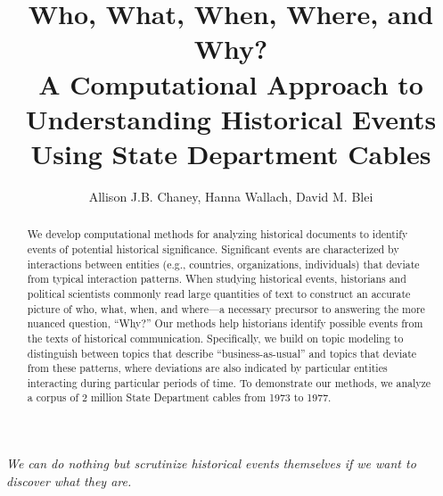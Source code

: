 



\usepackage{epigraph}



\title{Who, What, When, Where, and Why? \\ A Computational Approach to Understanding Historical Events Using State Department Cables}

\author{Allison J.B. Chaney, Hanna Wallach, David M. Blei}

\maketitle

\vspace{0.3in}

\begin{center}
\parbox{3.5in}{
\raggedright{
 	\emph{We can do nothing but scrutinize historical events themselves if we want to discover what they are.}}\\
\smallskip
{}
}
\end{center}

\vspace{0.5in}

\begin{abstract}
	We develop computational methods for analyzing historical documents to identify events of potential historical significance. Significant events are characterized by interactions between entities (e.g., countries, organizations, individuals) that deviate from typical interaction patterns. When studying historical events, historians and political scientists commonly read large quantities of text to construct an accurate picture of who, what, when, and where---a necessary precursor to answering the more nuanced question, ``Why?'' Our methods help historians identify possible events from the texts of historical communication. Specifically, we build on topic modeling to distinguish between topics that describe ``business-as-usual'' and topics that deviate from these patterns, where deviations are also indicated by particular entities interacting during particular periods of time. To demonstrate our methods, we analyze a corpus of 2 million State Department cables from 1973 to 1977. %
\end{abstract}


